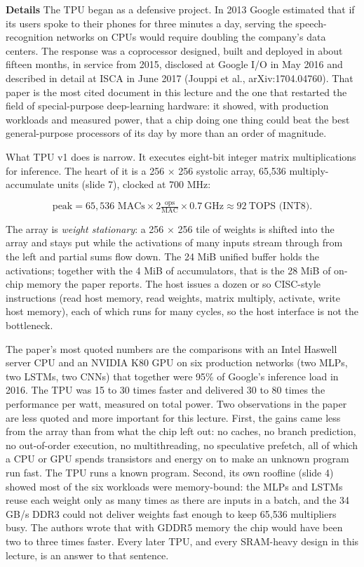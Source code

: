 \documentclass[11pt,letterpaper]{article}
\newcommand{\para}[1]{\medskip\noindent\textbf{#1}\quad}
\newenvironment{formulas}{\begin{tcolorbox}[formulabox]}{\end{tcolorbox}}
\begin{document}
\para{Details} The TPU began as a defensive project. In 2013 Google estimated that if its users spoke to their phones for three minutes a day, serving the speech-recognition networks on CPUs would require doubling the company's data centers. The response was a coprocessor designed, built and deployed in about fifteen months, in service from 2015, disclosed at Google I/O in May 2016 and described in detail at ISCA in June 2017 (Jouppi et al., arXiv:1704.04760). That paper is the most cited document in this lecture and the one that restarted the field of special-purpose deep-learning hardware: it showed, with production workloads and measured power, that a chip doing one thing could beat the best general-purpose processors of its day by more than an order of magnitude.

What TPU v1 does is narrow. It executes eight-bit integer matrix multiplications for inference. The heart of it is a 256 $\times$ 256 systolic array, 65{,}536 multiply-accumulate units (slide 7), clocked at 700 MHz:
\begin{formulas}
\[
\text{peak} = 65{,}536 \text{ MACs} \times 2 \tfrac{\text{ops}}{\text{MAC}} \times 0.7\ \text{GHz} \approx 92\ \text{TOPS (INT8)}.
\]
\end{formulas}
The array is \emph{weight stationary}: a 256 $\times$ 256 tile of weights is shifted into the array and stays put while the activations of many inputs stream through from the left and partial sums flow down. The 24 MiB unified buffer holds the activations; together with the 4 MiB of accumulators, that is the 28 MiB of on-chip memory the paper reports. The host issues a dozen or so CISC-style instructions (read host memory, read weights, matrix multiply, activate, write host memory), each of which runs for many cycles, so the host interface is not the bottleneck.

The paper's most quoted numbers are the comparisons with an Intel Haswell server CPU and an NVIDIA K80 GPU on six production networks (two MLPs, two LSTMs, two CNNs) that together were 95\% of Google's inference load in 2016. The TPU was 15 to 30 times faster and delivered 30 to 80 times the performance per watt, measured on total power. Two observations in the paper are less quoted and more important for this lecture. First, the gains came less from the array than from what the chip left out: no caches, no branch prediction, no out-of-order execution, no multithreading, no speculative prefetch, all of which a CPU or GPU spends transistors and energy on to make an unknown program run fast. The TPU runs a known program. Second, its own roofline (slide 4) showed most of the six workloads were memory-bound: the MLPs and LSTMs reuse each weight only as many times as there are inputs in a batch, and the 34 GB/s DDR3 could not deliver weights fast enough to keep 65{,}536 multipliers busy. The authors wrote that with GDDR5 memory the chip would have been two to three times faster. Every later TPU, and every SRAM-heavy design in this lecture, is an answer to that sentence.
\end{document}
